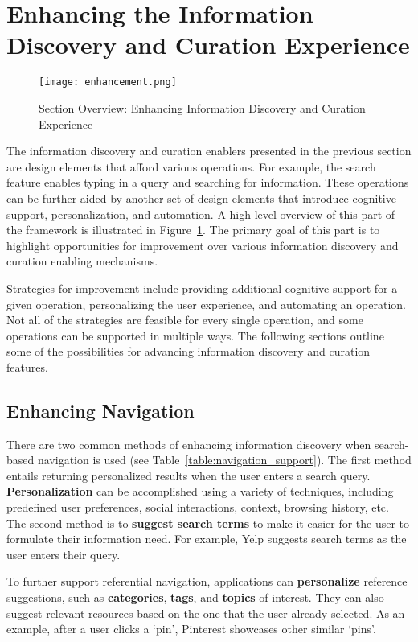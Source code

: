 {\section{Enhancing the Information Discovery and Curation Experience}
\label{section:enhancing}

\begin{figure}[ht!]
	\noindent
	\centering
	\texttt{[image: enhancement.png]}
	\caption{Section Overview: Enhancing Information Discovery and Curation Experience}
	\label{fig:enhancement} 
\end{figure}
The information discovery and curation enablers presented in the previous section are design elements that afford various operations. For example, the search feature enables typing in a query and searching for information. These operations can be further aided by another set of design elements that introduce cognitive support, personalization, and automation. A high-level overview of this part of the framework is illustrated in Figure~\ref{fig:enhancement}. The primary goal of this part is to highlight opportunities for improvement over various information discovery and curation enabling mechanisms.

Strategies for improvement include providing additional cognitive support for a given operation, personalizing the user experience, and automating an operation. Not all of the strategies are feasible for every single operation, and some operations can be supported in multiple ways. The following sections outline some of the possibilities for advancing information discovery and curation features. 

{\subsection{Enhancing Navigation}
There are two common methods of enhancing information discovery when search-based navigation is used (see Table~\ref{table:navigation_support}). The first method entails returning personalized results when the user enters a search query. \textbf{Personalization} can be accomplished using a variety of techniques, including predefined user preferences, social interactions, context, browsing history, etc. The second method is to \textbf{suggest search terms} to make it easier for the user to formulate their information need. For example, Yelp suggests search terms as the user enters their query.

\pagebreak
To further support referential navigation, applications can \textbf{personalize} reference suggestions, such as \textbf{categories}, \textbf{tags}, and \textbf{topics} of interest. They can also suggest relevant resources based on the one that the user already selected. As an example, after a user clicks a `pin', Pinterest showcases other similar `pins'.

}}
